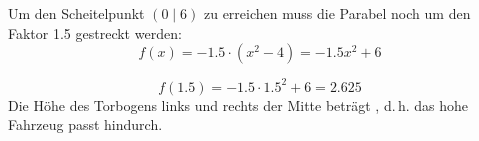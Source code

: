 \begin{exercise}
\begin{minipage}{11cm}
      Um den Scheitelpunkt $(0\mid6)$ zu erreichen muss die Parabel noch um den Faktor \num{1.5}
      gestreckt werden:
      \begin{equation*}
        f(x)=-\num{1.5}\cdot(x^2-4)=-\num{1.5}x^2+6
      \end{equation*}
    \end{minipage}%
  \fi
  \ifoutcome\outcome
    \begin{equation*}
      f(\num{1.5})=-\num{1.5}\cdot\num{1.5}^2+6=\num{2.625}
    \end{equation*}
    Die Höhe des Torbogens  links und rechts der Mitte beträgt
    , d.\,h. das  hohe Fahrzeug passt hindurch.
  \fi
\end{exercise}
